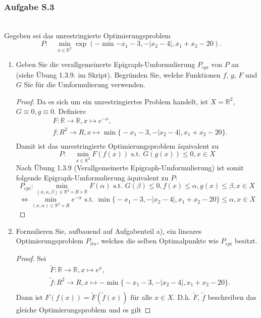 \documentclass[12pt]{extreport} %
\newcommand{\R}{\mathbb{R}}
\theoremstyle{named}
\theoremstyle{nnamed}
\theoremstyle{itshape}
\theoremstyle{normal}
\begin{document}
\subsubsection{Aufgabe S.3} ~\\
Gegeben sei das unrestringierte Optimierungsproblem
$$ P : \quad \min_{x \in \R^2} \exp \left(- \min{- x_1 - 3, -\left|x_2 - 4\right|, x_1 + x_2 - 20} \right).$$
\begin{enumerate}
	\item Geben Sie die verallgemeinerte Epigraph-Umformulierung $P_{epi}$ von $P$ an (siehe Übung 1.3.9. im Skript). Begründen Sie, welche Funktionen $f$, $g$, $F$ und $G$ Sie für die Umformulierung verwenden.
		\begin{proof}
			Da es sich um ein unrestringiertes Problem handelt, ist $X = \R^2$, $G \equiv 0, g \equiv 0$. Definiere
			\begin{align*}
				& F: \R \rightarrow \R, x \mapsto e^{-x}, \\
				&f: R^2 \rightarrow R, x \mapsto \min\big\{- x_1 - 3, -\left|x_2 - 4\right|, x_1 + x_2 - 20\big\}. \\
			\end{align*}
			Damit ist das unrestringierte Optimierungsproblem äquivalent zu
			$$ P : \quad \min_{x \in \R^2} F(f(x)) \text{ s.t. } G(g(x)) \leq 0, x \in X $$
			Nach Übung 1.3.9 (Verallgemeinerte Epigraph-Umformulierung) ist somit folgende Epigraph-Umformulierung äquivalent zu $P$:
			$$ P_{epi}: \min_{(x, \alpha, \beta) \in \R^2 \times R \times \R} F(\alpha) \text{ s.t. } G(\beta) \leq 0, f(x) \leq \alpha, g(x) \leq \beta, x \in X $$
			$$ \iff \min_{(x, \alpha) \in \R^2 \times R} e^{-\alpha} \text{ s.t. } \min\big\{- x_1 - 3, -\left|x_2 - 4\right|, x_1 + x_2 - 20\big\} \leq \alpha, x \in X $$
		\end{proof}
	\item Formulieren Sie, aufbauend auf Aufgabenteil a), ein lineares Optimierungsproblem $P_{lin}$, welches die selben Optimalpunkte wie $P_{epi}$ besitzt.
		\begin{proof}
			Sei
			\begin{align*}
				& \tilde{F}: \R \rightarrow \R, x \mapsto e^{x}, \\
				&\tilde{f}: R^2 \rightarrow R, x \mapsto -\min\big\{- x_1 - 3, -\left|x_2 - 4\right|, x_1 + x_2 - 20\big\}. \\
			\end{align*}
			Dann ist $F(f(x)) = \tilde{F}(\tilde{f}(x))$ für alle $x \in X$. D.h. $\tilde{F}$, $\tilde{f}$ beschreiben das gleiche Optimierungsproblem und es gilt

\end{proof}
\end{enumerate}
\end{document}
